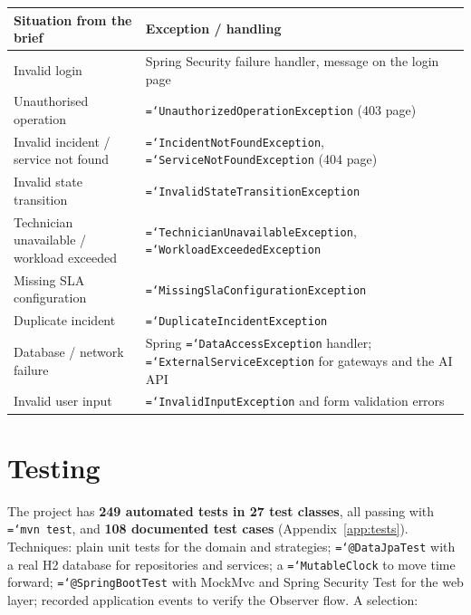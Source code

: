\documentclass[11pt,a4paper]{article}
\newcommand{\code}[1]{\texttt{\hyphenchar\font=`\-\relax #1}}
\begin{document}
\begin{tabularx}{\linewidth}{@{}L{5.2cm}Y@{}}
\toprule
\textbf{Situation from the brief} & \textbf{Exception / handling} \\
\midrule
Invalid login & Spring Security failure handler, message on the login page \\
Unauthorised operation & \code{UnauthorizedOperationException} (403 page) \\
Invalid incident / service not found & \code{IncidentNotFoundException}, \code{ServiceNotFoundException} (404 page) \\
Invalid state transition & \code{InvalidStateTransitionException} \\
Technician unavailable / workload exceeded & \code{TechnicianUnavailableException}, \code{WorkloadExceededException} \\
Missing SLA configuration & \code{MissingSlaConfigurationException} \\
Duplicate incident & \code{DuplicateIncidentException} \\
Database / network failure & Spring \code{DataAccessException} handler; \code{ExternalServiceException} for gateways and the AI API \\
Invalid user input & \code{InvalidInputException} and form validation errors \\
\bottomrule
\end{tabularx}

\section{Testing}
The project has \textbf{249 automated tests in 27 test classes}, all passing with \code{mvn test}, and \textbf{108 documented test cases} (Appendix~\ref{app:tests}). Techniques: plain unit tests for the domain and strategies; \code{@DataJpaTest} with a real H2 database for repositories and services; a \code{MutableClock} to move time forward; \code{@SpringBootTest} with MockMvc and Spring Security Test for the web layer; recorded application events to verify the Observer flow. A selection:
\end{document}
